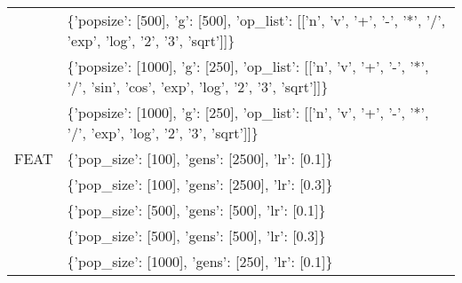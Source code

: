 \begin{tabular}{l p{37em}}
              &                                                                                                                                                                                                      \{'popsize': [500], 'g': [500], 'op\_list': [['n', 'v', '+', '-', '*', '/', 'exp', 'log', '2', '3', 'sqrt']]\} \\
              &                                                                                                                                                                                       \{'popsize': [1000], 'g': [250], 'op\_list': [['n', 'v', '+', '-', '*', '/', 'sin', 'cos', 'exp', 'log', '2', '3', 'sqrt']]\} \\
              &                                                                                                                                                                                                     \{'popsize': [1000], 'g': [250], 'op\_list': [['n', 'v', '+', '-', '*', '/', 'exp', 'log', '2', '3', 'sqrt']]\} \\
         FEAT &                                                                                                                                                                                                                                                                 \{'pop\_size': [100], 'gens': [2500], 'lr': [0.1]\} \\
              &                                                                                                                                                                                                                                                                 \{'pop\_size': [100], 'gens': [2500], 'lr': [0.3]\} \\
              &                                                                                                                                                                                                                                                                  \{'pop\_size': [500], 'gens': [500], 'lr': [0.1]\} \\
              &                                                                                                                                                                                                                                                                  \{'pop\_size': [500], 'gens': [500], 'lr': [0.3]\} \\
              &                                                                                                                                                                                                                                                                 \{'pop\_size': [1000], 'gens': [250], 'lr': [0.1]\} \\

\end{tabular}

